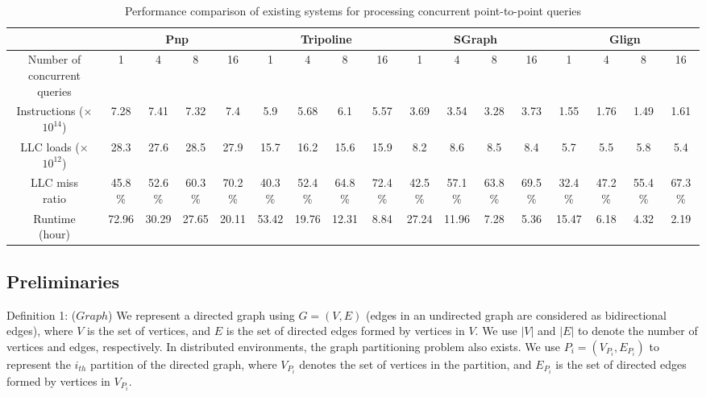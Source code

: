 \documentclass[lettersize,journal]{IEEEtran} %
\begin{document}
\begin{table}
  \centering
  \renewcommand\arraystretch{1.5}
  \tabcolsep=0.02cm
  \tiny
  
  \begin{tabular}{|c|c|c|c|c|c|c|c|c|c|c|c|c|c|c|c|c|}
    \hline
    \rule{0pt}{8pt} 
    \multirow{1}{*}{System} & \multicolumn{4}{c|}{Pnp} & \multicolumn{4}{c|}{Tripoline} & \multicolumn{4}{c|}{SGraph} & \multicolumn{4}{c|}{Glign} \\
    \hline
    \rule{0pt}{11pt} 
    \makecell{Number of \\ concurrent \\ queries} & 1 & 4 & 8 & 16  & 1 & 4 & 8 & 16 & 1 & 4 & 8 & 16 & 1 & 4 & 8 & 16 \\
    \hline
    \rule{0pt}{9pt} 
    \makecell{Instructions \\ (×$10^{14}$)} & 7.28 & 7.41 & 7.32 & 7.4 & 5.9 & 5.68 & 6.1 & 5.57 & 3.69 & 3.54 & 3.28 & 3.73 & 1.55 & 1.76 & 1.49 & 1.61 \\
    \hline
    \rule{0pt}{9pt} 
    \makecell{LLC loads \\ (×$10^{12}$)} & 28.3 & 27.6 & 28.5 & 27.9 & 15.7 & 16.2 & 15.6 & 15.9 & 8.2 & 8.6 & 8.5 & 8.4 & 5.7 & 5.5 & 5.8 & 5.4 \\
    \hline
    \rule{0pt}{9pt} 
    \makecell{LLC miss \\ ratio} & 45.8\% & 52.6\% & 60.3\% & 70.2\% & 40.3\% & 52.4\% & 64.8\% & 72.4\% & 42.5\% & 57.1\% & 63.8\% & 69.5\% & 32.4\% & 47.2\% & 55.4\% & 67.3\% \\
    \hline
    \rule{0pt}{9pt} 
    \makecell{Runtime \\ (hour)} & 72.96 & 30.29 & 27.65 & 20.11 & 53.42 & 19.76 & 12.31 & 8.84 & 27.24 & 11.96 & 7.28 & 5.36 & 15.47 & 6.18 & 4.32 & 2.19 \\
    \hline
  \end{tabular}
  \caption{Performance comparison of existing systems for processing concurrent point-to-point queries}
  \label{System_comparison}
\end{table}



\subsection{Preliminaries}
Definition 1: ($Graph$) We represent a directed graph using $G=(V, E)$ (edges in an undirected graph are considered as bidirectional edges), where $V$ is the set of vertices, and $E$ is the set of directed edges formed by vertices in $V$. We use $|V|$ and $|E|$ to denote the number of vertices and edges, respectively. In distributed environments, the graph partitioning problem also exists. We use $P_i=(V_{P_i}, E_{P_i})$ to represent the $i_{th}$ partition of the directed graph, where $V_{P_i}$ denotes the set of vertices in the partition, and $E_{P_i}$ is the set of directed edges formed by vertices in $V_{P_i}$.
\end{document}
